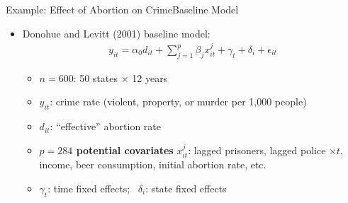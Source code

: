 \documentclass[hyperref={pdfpagelabels=false}]{beamer}
\begin{document}
\begin{frame}{Example: Effect of Abortion on Crime}{Baseline Model}
    \begin{itemize}
        \item Donohue and Levitt (2001) baseline model:
        \begin{eqnarray*}
            y_{it} = \alpha_{0} d_{it} + \sum^{p}_{j=1} \beta_{j} 
            x^{j}_{it} + \gamma_{t} + \delta_{i} + \epsilon_{it}
        \end{eqnarray*}
        \begin{itemize}
            \item $n = 600$: 50 states $\times$ 12 years
            \vspace{0.1cm}
            \item $y_{it}$: crime rate (violent, property, or murder 
            per 1,000 people)
            \vspace{0.1cm}
            \item $d_{it}$: ``effective'' abortion rate
            \vspace{0.1cm}
            \item \textbf{$p = 284$ potential covariates} $x^{j}_{it}$: 
            lagged prisoners, lagged police $\times t$, income, 
            beer consumption, initial abortion rate, etc.
            \vspace{0.1cm}
            \item $\gamma_{t}$: time fixed effects; \ 
            $\delta_{i}$: state fixed effects
        \end{itemize}
    \end{itemize}
\end{frame}
	
	
	
\end{document}
